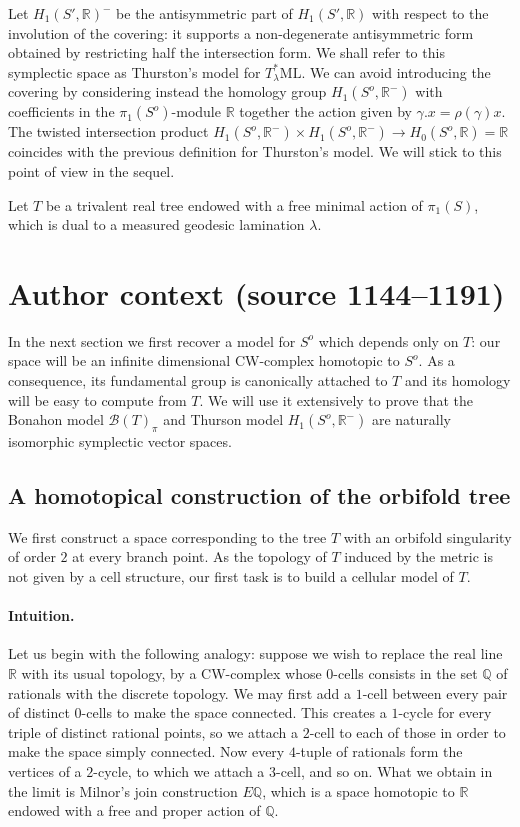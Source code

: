 \documentclass[10pt,a4paper]{amsart}
\newcommand{\R}{\mathbb{R}}
\newcommand{\Bb}{\mathcal{B}}
\newcommand{\ML}{\mathrm{ML}}
\newcommand{\Q}{\mathbb{Q}}
\begin{document}
Let $H_1(S',\R)^-$ be the antisymmetric part of $H_1(S',\R)$ with respect to the involution of the covering: it supports a non-degenerate antisymmetric form obtained by restricting half the intersection form.
%
We shall refer to this symplectic space as Thurston's model for $T^*_\lambda\ML$.
%
We can avoid introducing the covering by considering instead the homology group $H_1(S^o,\R^-)$ with coefficients in the $\pi_1(S^o)$-module $\R$ together the action given by $\gamma.x=\rho(\gamma)x$. The twisted intersection product $H_1(S^o,\R^-)\times H_1(S^o,\R^-)\to H_0(S^o,\R)=\R$ coincides with the previous definition for Thurston's model. We will stick to this point of view in the sequel.

Let $T$ be a trivalent real tree endowed with a free minimal action of $\pi_1(S)$, which is dual to a measured geodesic lamination $\lambda$. %

\section*{Author context (source 1144--1191)}
In the next section we first recover a model for $S^o$ which depends only on $T$: our space will be an infinite dimensional CW-complex homotopic to $S^o$. As a consequence, its fundamental group is canonically attached to $T$ and its homology will be easy to compute from $T$. We will use it extensively to prove that the Bonahon model $\Bb(T)_\pi$ and Thurson model $H_1(S^o,\R^-)$ are naturally isomorphic symplectic vector spaces. 


\subsection{A homotopical construction of the orbifold tree}

We first construct a space corresponding to the tree $T$ with an orbifold singularity of order $2$ at every branch point.
%
As the topology of $T$ induced by the metric is not given by a cell structure, our first task is to build a cellular model of $T$.

\paragraph{Intuition.}
Let us begin with the following analogy: suppose we wish to replace the real line $\R$ with its usual topology, by a CW-complex whose $0$-cells consists in the set $\Q$ of rationals with the discrete topology. We may first add a $1$-cell between every pair of distinct $0$-cells to make the space connected. This creates a $1$-cycle for every triple of distinct rational points, so we attach a $2$-cell to each of those in order to make the space simply connected. Now every $4$-tuple of rationals form the vertices of a $2$-cycle, to which we attach a $3$-cell, and so on.
%
What we obtain in the limit is Milnor's join construction $E\Q$, which is a space homotopic to $\R$ endowed with a free and proper action of $\Q$. 
\end{document}
